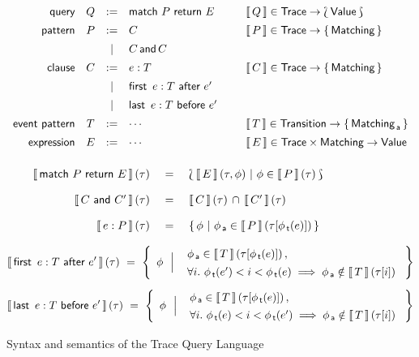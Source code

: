 
\begin{figure}[p]
\hrulefill
\centering
\begin{equation*}\label{tql-syntax}
  \arraycolsep=5pt
  \def\arraystretch{1.4}
  \begin{array}{rcclcl}
    \m{query} & Q & := & 
    \MatchRet{\TracePat}{E} \ \, 
    & \ &  \Sem{Q} \in \Trace \to \Bag{\Value} \\
    \m{pattern} & \TracePat & := & C
    & & \Sem{\TracePat} \in \Trace \to \Set{\Matching} \\
    &  & | &  C \,\textsf{and}\, C \\
    \m{clause} & C & := & e:\TransPat
     &  & \Sem{C} \in \Trace \to \Set{\Matching} \\
     &  & | & \FirstAfter{e:\TransPat}{e'} \\
     &  & | & \LastBefore{e:\TransPat}{e'} \\
    \m{event pattern} &  \TransPat & := & \cdots  %
     & & \Sem{\TransPat} \in \Transition \to \Set{\Matching_{\Ag}}  \\
    \m{expression} & E & := & \cdots
     & & \Sem{E} \in \Trace \times \Matching \to \Value \\
  \end{array}
\end{equation*}
\smallskip
\begin{equation*}
    \def\arraystretch{1.9}
    \begin{array}{rcl}
     \Sem{\MatchRet{\TracePat}{E}}(\tau) & \ = \ &
     \BagC{\Sem{E}(\tau, \phi)}{\phi \in \Sem{\TracePat}(\tau)} \\
     \Sem{C \m{ and } C'}(\tau) & = & 
     \Sem{C}(\tau) \Inter \Sem{C'}(\tau) \\
     \Sem{ e : P }(\tau) & = & 
     \SetC{\phi}{\phi_{\Ag} \in \Sem{P}(\At{\tau}{\phi_{\Tr}(e)})} \\
  \end{array}
\end{equation*}
\smallskip
\[
 \Sem{ \FirstAfter{e:\TransPat}{e'} }(\tau)  \ = \  
     \LargeMultilineSetC{\phi}{ 
       \phi_{\Ag} \in \Sem{\TransPat}(\At{\tau}{\phi_{\Tr}(e)}) \,,}{
       \forall i. \ \phi_{\Tr}(e') < i < \phi_{\Tr}(e) \implies
       \phi_{\Ag} \notin \Sem{\TransPat}(\At{\tau}{i})
     }
\]
\[
 \Sem{ \LastBefore{e:\TransPat}{e'} }(\tau)  \ = \
     \LargeMultilineSetC{\phi}{ 
       \phi_{\Ag} \in \Sem{\TransPat}(\At{\tau}{\phi_{\Tr}(e)}) \,,}{
       \forall i. \ \phi_{\Tr}(e) < i < \phi_{\Tr}(e') \implies
       \phi_{\Ag} \notin \Sem{\TransPat}(\At{\tau}{i})
     }
\]

\medskip
\hrulefill
\smallskip

\caption{Syntax and semantics of the Trace Query Language}
\label{fig:semantics}
\end{figure}